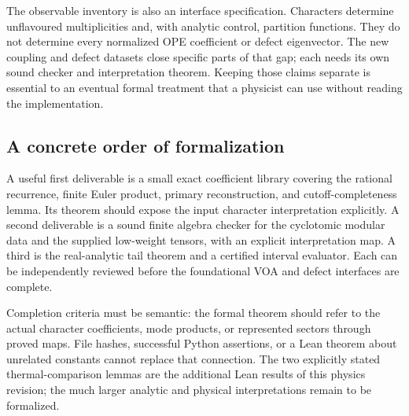 The observable inventory is also an interface specification. Characters
determine unflavoured multiplicities and, with analytic control,
partition functions. They do not determine every normalized OPE
coefficient or defect eigenvector. The new coupling and defect datasets
close specific parts of that gap; each needs its own sound checker and
interpretation theorem. Keeping those claims separate is essential to
an eventual formal treatment that a physicist can use without reading
the implementation.

\subsection{A concrete order of formalization}

A useful first deliverable is a small exact coefficient library covering
the rational recurrence, finite Euler product, primary reconstruction,
and cutoff-completeness lemma. Its theorem should expose the input
character interpretation explicitly. A second deliverable is a sound
finite algebra checker for the cyclotomic modular data and the supplied
low-weight tensors, with an explicit interpretation map. A third is
the real-analytic tail theorem and a certified interval evaluator.
Each can be independently reviewed before the foundational VOA and
defect interfaces are complete.

Completion criteria must be semantic: the formal theorem should refer
to the actual character coefficients, mode products, or represented
sectors through proved maps. File hashes, successful Python assertions,
or a Lean theorem about unrelated constants cannot replace that
connection. The two explicitly stated thermal-comparison lemmas are
the additional Lean results of this physics revision; the much larger
analytic and physical interpretations remain to be formalized.
